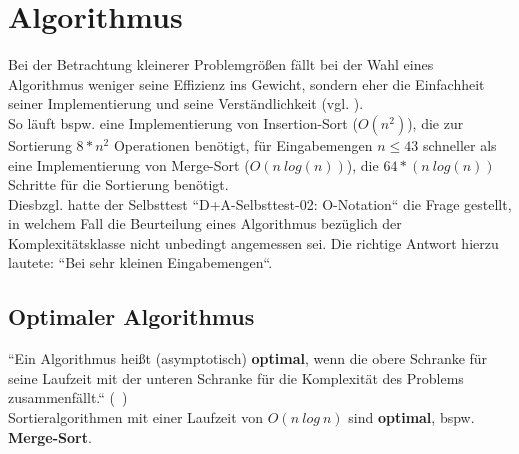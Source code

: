 \section{Algorithmus}

Bei der Betrachtung kleinerer Problemgrößen fällt bei der Wahl eines Algorithmus weniger seine Effizienz ins Gewicht, sondern eher die Einfachheit seiner Implementierung und seine Verständlichkeit (vgl. \cite[5 f.]{GD18a}).\\

\noindent
So läuft bspw. eine Implementierung von Insertion-Sort ($O(n^2)$), die zur Sortierung $8*n^2$ Operationen benötigt, für Eingabemengen $n \leq 43$ schneller als eine Implementierung von Merge-Sort ($O(n\ log(n))$), die $64 * (n\ log(n))$ Schritte für die Sortierung benötigt.\\

\noindent
Diesbzgl. hatte der Selbsttest ``D+A-Selbsttest-02: O-Notation`` die Frage gestellt, in welchem Fall die Beurteilung eines Algorithmus bezüglich der Komplexitätsklasse nicht unbedingt angemessen sei. Die richtige Antwort hierzu lautete: ``Bei sehr kleinen Eingabemengen``.\\

\subsection{Optimaler Algorithmus}
\begin{tcolorbox}[title={Optimaler Algorithmus}]
    ``Ein Algorithmus heißt (asymptotisch) \textbf{optimal}, wenn die obere Schranke für seine Laufzeit mit der unteren Schranke für die Komplexität des Problems zusammenfällt.`` (~\cite[20]{GD18a})\\

    \noindent
    Sortieralgorithmen mit einer Laufzeit von $O(n\ log\ n)$ sind \textbf{optimal}, bspw. \textbf{Merge-Sort}.
\end{tcolorbox}


